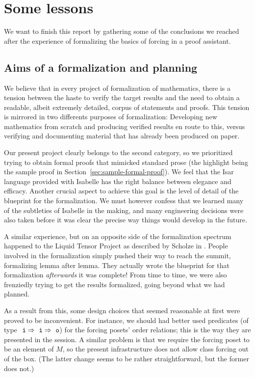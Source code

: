 \section{Some lessons}\label{sec:lessons}

We want to finish this report by gathering some of the conclusions we
reached after the experience of formalizing the basics of forcing in a
proof assistant.

\subsection{Aims of a formalization and planning}

We believe that in every project of formalization of mathematics,
there is a tension between the haste to verify the target results and
the need to obtain a readable, albeit extremely detailed, corpus of
statements and proofs. This tension is mirrored in two differents
purposes of formalization: Developing new mathematics from scratch and
producing verified results en route to this, versus verifying and
documenting material that has already been produced on paper.

Our present project clearly belongs to the second category, so we
prioritized trying to obtain formal proofs that mimicked standard
prose (the highlight being the sample proof in
Section~\ref{sec:sample-formal-proof}). We feel that the Isar language
provided with Isabelle has the right balance between elegance and
efficacy. Another crucial aspect to achieve this goal is the level of
detail of the blueprint for the formalization. We must however confess
that we learned many of the subtleties of Isabelle in the making, and
many engineering decisions were also taken before it was clear the
precise way things would develop in the future.

A similar experience, but on an opposite side of the formalization
spectrum happened to the Liquid Tensor Project as described by Scholze
in \cite{LTE2021}. People involved in the formalization simply pushed
their way to reach the summit, formalizing lemma after lemma. They
actually wrote the blueprint for that formalization \emph{afterwards}
it was complete! From time to time, we were also frenziedly trying to
get the results formalized, going beyond what we had planned.

As a result from this, some design choices that seemed reasonable at
first were proved to be inconvenient. For instance, we should had
better used predicates (of type $\tyi\fun\tyi\fun\tyo$) for the
forcing posets' order relations; this is the way they
are presented in the  session. A similar
problem is that we require the forcing poset to be an element of $M$,
so the present infrastructure does not allow class forcing out of the
box. (The latter change seems to be rather straightforward, but the
former does not.)

